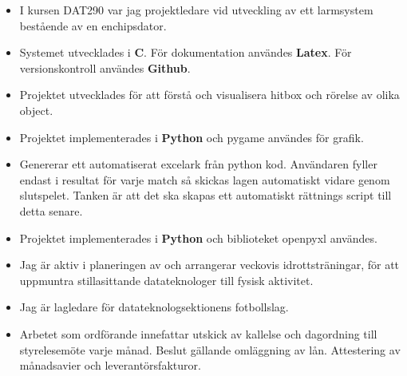 \documentclass[10pt,a4paper,ragged2e]{altacv}
\begin{document}
\begin{fullwidth}

\begin{itemize}
  \item I kursen DAT290 var jag projektledare vid utveckling av ett larmsystem bestående av en enchipsdator.
  \item Systemet utvecklades i \textbf{C}. För dokumentation användes \textbf{Latex}. För versionskontroll användes \textbf{Github}.
\end{itemize}

\divider

\begin{itemize}
  \item Projektet utvecklades för att förstå och visualisera hitbox och rörelse av olika object.
  \item Projektet implementerades i \textbf{Python} och pygame användes för grafik.
\end{itemize}

\divider

\begin{itemize}
  \item Genererar ett automatiserat excelark från python kod. Användaren fyller endast i resultat för varje match så skickas lagen automatiskt vidare genom slutspelet. Tanken är att det ska skapas ett automatiskt rättnings script till detta senare.
  \item Projektet implementerades i \textbf{Python} och biblioteket openpyxl användes.
\end{itemize}


\begin{itemize}
  \item Jag är aktiv i planeringen av och arrangerar veckovis idrottsträningar, för att uppmuntra  stillasittande datateknologer till fysisk aktivitet. 
  \item Jag är lagledare för datateknologsektionens fotbollslag.
\end{itemize}

\divider

\begin{itemize}
  \item Arbetet som ordförande innefattar utskick av kallelse och dagordning till styrelesemöte varje månad. Beslut gällande omläggning av lån. Attestering av månadsavier och leverantörsfakturor.
\end{itemize}


\end{fullwidth}
\end{document}
